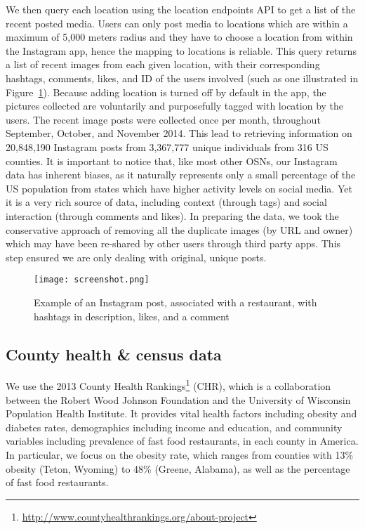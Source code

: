 \documentclass{sig-alternate-2013}
\begin{document}
We then query each location using the location endpoints API to get a list of the recent posted media. Users can only post media to locations which are within a maximum of 5,000 meters radius and they have to choose a location from within the Instagram app, hence the mapping to locations is reliable. This query returns a list of recent images from each given location, with their corresponding hashtags, comments, likes, and ID of the users involved (such as one illustrated in Figure~\ref{figure:screenshot}). Because adding location is turned off by default in the app, the pictures collected are voluntarily and purposefully tagged with location by the users. The recent image posts were collected once per month, throughout September, October, and November 2014. This lead to retrieving information on 20,848,190 Instagram posts from 3,367,777 unique individuals from 316 US counties. It is important to notice that, like most other OSNs, our Instagram data has inherent biases, as it naturally represents only a small percentage of the US population from states which have higher activity levels on social media. Yet it is a very rich source of data, including context (through tags) and social interaction (through comments and likes). In preparing the data, we took the conservative approach of removing all the duplicate images (by URL and owner) which may have been re-shared by other users through third party apps. This step ensured we are only dealing with original, unique posts. 

\begin{figure}[t]
\centering
\texttt{[image: screenshot.png]}
\caption{Example of an Instagram post, associated with a restaurant, with hashtags in description, likes, and a comment}
\label{figure:screenshot}
\end{figure}
\vspace{0.5cm}

\subsection{County health \& census data}

We use the 2013 County Health Rankings\footnote{\url{http://www.countyhealthrankings.org/about-project}} (CHR), which is a collaboration between the Robert Wood Johnson Foundation and the University of Wisconsin Population Health Institute. It provides vital health factors including obesity and diabetes rates, demographics including income and education, and community variables including prevalence of fast food restaurants, in each county in America. In particular, we focus on the obesity rate, which ranges from counties with 13\% obesity (Teton, Wyoming) to 48\% (Greene, Alabama), as well as the percentage of fast food restaurants. 
\end{document}
